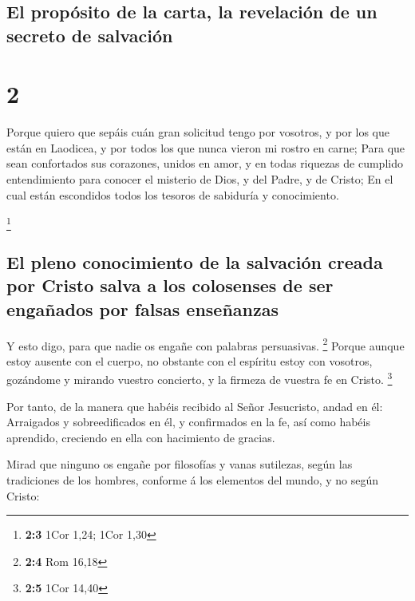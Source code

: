 \hypertarget{el-propuxf3sito-de-la-carta-la-revelaciuxf3n-de-un-secreto-de-salvaciuxf3n}{%
\subsection{El propósito de la carta, la revelación de un secreto de
salvación}\label{el-propuxf3sito-de-la-carta-la-revelaciuxf3n-de-un-secreto-de-salvaciuxf3n}}

\hypertarget{section-1}{%
\section{2}\label{section-1}}

 Porque quiero que sepáis cuán gran solicitud tengo por
vosotros, y por los que están en Laodicea, y por todos los que nunca
vieron mi rostro en carne;  Para que sean confortados sus
corazones, unidos en amor, y en todas riquezas de cumplido entendimiento
para conocer el misterio de Dios, y del Padre, y de Cristo; 
En el cual están escondidos todos los tesoros de sabiduría y
conocimiento.

\footnote{\textbf{2:3} 1Cor 1,24; 1Cor 1,30}

\hypertarget{el-pleno-conocimiento-de-la-salvaciuxf3n-creada-por-cristo-salva-a-los-colosenses-de-ser-engauxf1ados-por-falsas-enseuxf1anzas}{%
\subsection{El pleno conocimiento de la salvación creada por Cristo
salva a los colosenses de ser engañados por falsas
enseñanzas}\label{el-pleno-conocimiento-de-la-salvaciuxf3n-creada-por-cristo-salva-a-los-colosenses-de-ser-engauxf1ados-por-falsas-enseuxf1anzas}}

 Y esto digo, para que nadie os engañe con palabras
persuasivas. \footnote{\textbf{2:4} Rom 16,18}  Porque
aunque estoy ausente con el cuerpo, no obstante con el espíritu estoy
con vosotros, gozándome y mirando vuestro concierto, y la firmeza de
vuestra fe en Cristo. \footnote{\textbf{2:5} 1Cor 14,40}

 Por tanto, de la manera que habéis recibido al Señor
Jesucristo, andad en él:  Arraigados y sobreedificados en
él, y confirmados en la fe, así como habéis aprendido, creciendo en ella
con hacimiento de gracias.

 Mirad que ninguno os engañe por filosofías y vanas
sutilezas, según las tradiciones de los hombres, conforme á los
elementos del mundo, y no según Cristo:


